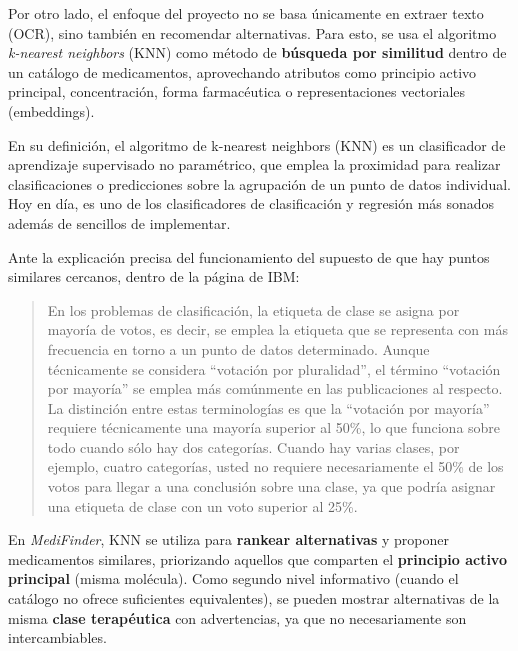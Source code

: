 Por otro lado, el enfoque del proyecto no se basa únicamente en extraer texto (OCR), sino también en recomendar alternativas. Para esto, se usa el algoritmo \textit{k-nearest neighbors} (KNN) como método de \textbf{búsqueda por similitud} dentro de un catálogo de medicamentos, aprovechando atributos como principio activo principal, concentración, forma farmacéutica o representaciones vectoriales (embeddings).

En su definición, el algoritmo de k-nearest neighbors (KNN) es un clasificador de aprendizaje supervisado no paramétrico, que emplea la proximidad para realizar clasificaciones o predicciones sobre la agrupación de un punto de datos individual. Hoy en día, es uno de los clasificadores de clasificación y regresión más sonados además de sencillos de implementar.

Ante la explicación precisa del funcionamiento del supuesto de que hay puntos similares cercanos, dentro de la página de IBM:

\begin{quote}
	En los problemas de clasificación, la etiqueta de clase se asigna por mayoría de votos, es decir, se emplea la etiqueta que se representa con más frecuencia en torno a un punto de datos determinado. Aunque técnicamente se considera ``votación por pluralidad'', el término ``votación por mayoría'' se emplea más comúnmente en las publicaciones al respecto. La distinción entre estas terminologías es que la ``votación por mayoría'' requiere técnicamente una mayoría superior al 50\%, lo que funciona sobre todo cuando sólo hay dos categorías. Cuando hay varias clases, por ejemplo, cuatro categorías, usted no requiere necesariamente el 50\% de los votos para llegar a una conclusión sobre una clase, ya que podría asignar una etiqueta de clase con un voto superior al 25\%. \cite{ibm2025knn}
\end{quote}

En \textit{MediFinder}, KNN se utiliza para \textbf{rankear alternativas} y proponer medicamentos similares, priorizando aquellos que comparten el \textbf{principio activo principal} (misma molécula). Como segundo nivel informativo (cuando el catálogo no ofrece suficientes equivalentes), se pueden mostrar alternativas de la misma \textbf{clase terapéutica} con advertencias, ya que no necesariamente son intercambiables.

\pagebreak